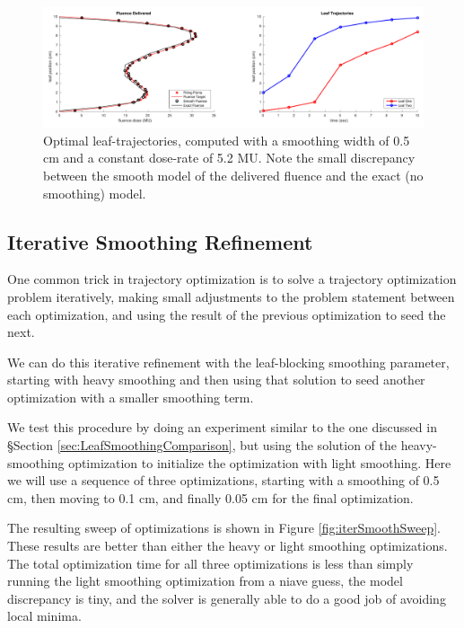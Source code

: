 \begin{figure}
  \centering
  \includegraphics[width=\textwidth]{fig/fluenceMapSmoothingExample.pdf}
  \caption{ Optimal leaf-trajectories, computed with a smoothing width of 0.5 cm and a constant
            dose-rate of 5.2 MU. Note the small discrepancy between the smooth model of the
            delivered fluence and the exact (no smoothing) model.}
  \label{fig:fluenceMapSmoothingExample}
\end{figure}


\subsection{Iterative Smoothing Refinement}

One common trick in trajectory optimization is to solve a trajectory optimization problem
iteratively, making small adjustments to the problem statement between each optimization,
and using the result of the previous optimization to seed the next.

We can do this iterative refinement with the leaf-blocking smoothing parameter,
starting with heavy smoothing and then using that solution to seed another optimization
with a smaller smoothing term.

We test this procedure by doing an experiment similar to the one discussed in
\S Section \ref{sec:LeafSmoothingComparison}, but using the solution of the heavy-smoothing
optimization to initialize the optimization with light smoothing.
Here we will use a sequence of three optimizations, starting with a smoothing of
0.5 cm, then moving to 0.1 cm, and finally 0.05 cm for the final optimization.

The resulting sweep of optimizations is shown in Figure \ref{fig:iterSmoothSweep}.
These results are better than either the heavy or light smoothing optimizations.
The total optimization time for all three optimizations is less than simply running the
light smoothing optimization from a niave guess, the model discrepancy is tiny, and the
solver is generally able to do a good job of avoiding local minima.

